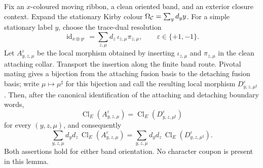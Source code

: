 \begin{lemma}
\label{lem:weighted-kirby-colour-slide}
Fix an $x$-coloured moving ribbon, a clean oriented band, and an exterior
closure context.  Expand the stationary Kirby colour
$\Omega_{\mathcal{C}}=\sum_y d_y y$.  For a simple stationary label $y$, choose the
trace-dual resolution
\[
  \operatorname{id}_{x\otimes y^\varepsilon}
  =\sum_{z,\mu}d_z\,\iota_{z,\mu}\pi_{z,\mu},
  \qquad \varepsilon\in\{+1,-1\}.
\]
Let $A^\varepsilon_{y,z,\mu}$ be the local morphism obtained by inserting
$\iota_{z,\mu}$ and $\pi_{z,\mu}$ in the clean attaching collar.  Transport
the insertion along the finite band route.  Pivotal mating gives a bijection
from the attaching fusion basis to the detaching fusion basis; write
$\mu\mapsto\mu^\sharp$ for this bijection and call the resulting local
morphism $D^\varepsilon_{y,z,\mu^\sharp}$.  Then, after the canonical
identification of the attaching and detaching boundary words,
\[
  \operatorname{Cl}_E(A^\varepsilon_{y,z,\mu})
  =\operatorname{Cl}_E(D^\varepsilon_{y,z,\mu^\sharp})
\]
for every $(y,z,\mu)$, and consequently
\[
  \sum_{y,z,\mu}d_y d_z\,
    \operatorname{Cl}_E(A^\varepsilon_{y,z,\mu})
  =
  \sum_{y,z,\mu}d_y d_z\,
    \operatorname{Cl}_E(D^\varepsilon_{y,z,\mu^\sharp}).
\]
Both assertions hold for either band orientation.  No character coupon is
present in this lemma.
\end{lemma}

